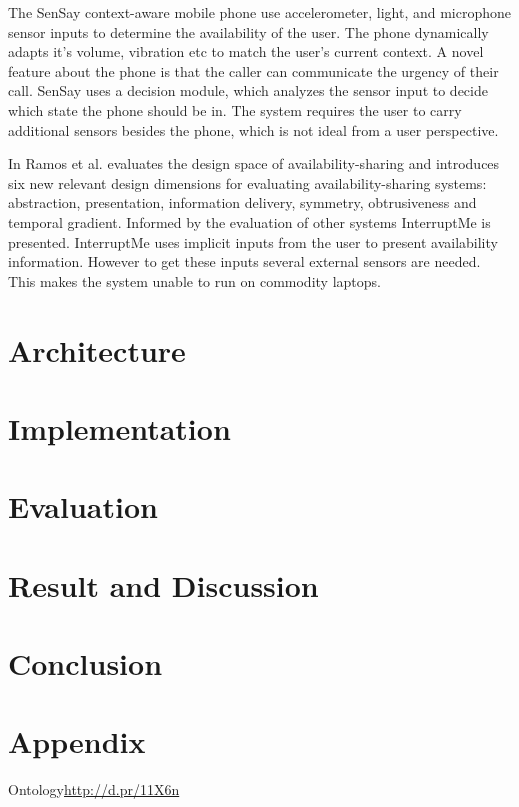 \documentclass{sigchi}
\begin{document}
The SenSay context-aware mobile phone\cite{siewiorek2003sensay} use accelerometer, light, and microphone sensor inputs to determine the availability of the user. The phone dynamically adapts it’s volume, vibration etc to match the user's current context. A novel feature about the phone is that the caller can communicate the urgency of their call. SenSay uses a decision module, which analyzes the sensor input to decide which state the phone should be in. The system requires the user to carry additional sensors besides the phone, which is not ideal from a user perspective.

In \cite{Ramos2011} Ramos et al. evaluates the design space of availability-sharing and introduces six new relevant design dimensions for evaluating availability-sharing systems: abstraction, presentation, information delivery, symmetry, obtrusiveness and temporal gradient. Informed by the evaluation of other systems InterruptMe is presented. InterruptMe uses implicit inputs from the user to present availability information. However to get these inputs several external sensors are needed. This makes the system unable to run on commodity laptops.

\section{Architecture}

\section{Implementation}

\section{Evaluation}

\section{Result and Discussion}

\section{Conclusion}

\balance



\section{Appendix}
Ontology\url{http://d.pr/11X6n}
\end{document}
